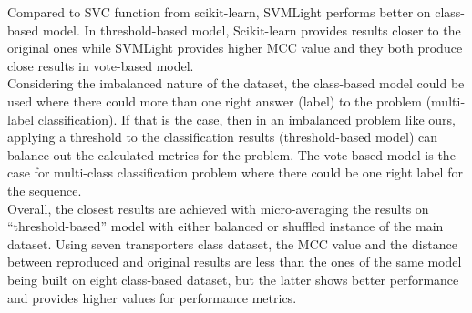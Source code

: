     Compared to SVC function from scikit-learn, SVMLight performs better on class-based model. In threshold-based model, 
    Scikit-learn provides results closer to the original ones while SVMLight provides higher MCC value and they both produce 
    close results in vote-based model.\\
    
    Considering the imbalanced nature of the dataset, the class-based model could be used where 
    there could more than one right answer (label) to the problem (multi-label classification). 
    If that is the case, then in an imbalanced problem like ours, 
    applying a threshold to the classification results (threshold-based model) can balance out the calculated metrics 
    for the problem. The vote-based model is the case for multi-class classification problem where there could 
    be one right label for the sequence.\\
    
    Overall, the closest results are achieved with micro-averaging the results on “threshold-based” model with either 
    balanced or shuffled instance of the main dataset. Using seven transporters class dataset, the MCC value and the distance 
    between reproduced and original results are less than the ones of the same model being built on eight class-based dataset, 
    but the latter shows better performance and provides higher values for performance metrics.\\




